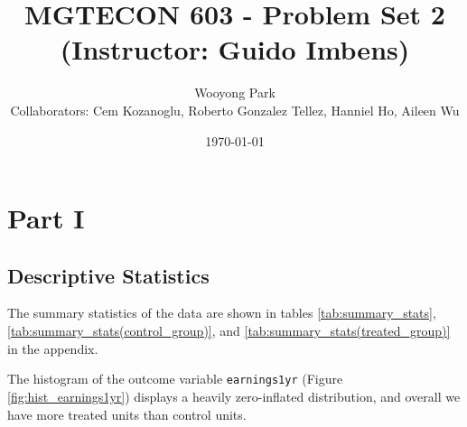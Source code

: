 \documentclass[11pt]{article}
\title{MGTECON 603 - Problem Set 2\\ \small{(Instructor: Guido Imbens)}}
\author{Wooyong Park\\ {\small Collaborators: Cem Kozanoglu, Roberto Gonzalez Tellez, Hanniel Ho, Aileen Wu}}
\date{\today}
\numberwithin{equation}{section}
\begin{document}
\maketitle

\section{Part I}

\subsection*{Descriptive Statistics}

The summary statistics of the data are shown in tables \ref{tab:summary_stats}, \ref{tab:summary_stats(control_group)}, and \ref{tab:summary_stats(treated_group)} in the appendix.

The histogram of the outcome variable \verb|earnings1yr| (Figure \ref{fig:hist_earnings1yr}) displays a heavily zero-inflated distribution, and overall we have more treated units than control units.
\end{document}
